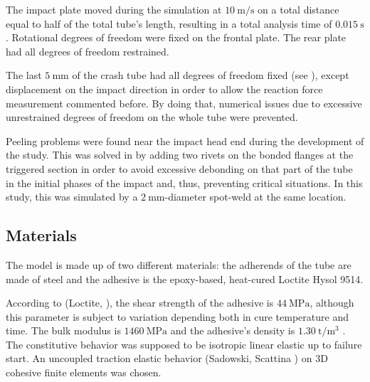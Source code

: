 \documentclass[cmfonts]{witpress}
\begin{document}
The impact plate moved during the simulation at $\SI{10}{\m/\s}$ on a total distance equal to half of the total tube's length, resulting in a total analysis time of $\SI{0.015}{\s}$. Rotational degrees of freedom were fixed on the frontal plate. The rear plate had all degrees of freedom restrained.

The last $\SI{5}{\mm}$ of the crash tube had all degrees of freedom fixed (see ), except displacement on the impact direction in order to allow the reaction force measurement commented before. By doing that, numerical issues due to excessive unrestrained degrees of freedom on the whole tube were prevented.

Peeling problems were found near the impact head end during the development of the study. This was solved in \cite{Peroni2009} by adding two rivets on the bonded flanges at the triggered section in order to avoid excessive debonding on that part of the tube in the initial phases of the impact and, thus, preventing critical situations. In this study, this was simulated by a $\SI{2}{\mm}$-diameter spot-weld at the same location.

\subsection{Materials}

The model is made up of two different materials: the adherends of the tube are made of steel and the adhesive is the epoxy-based, heat-cured Loctite Hysol 9514.

According to (Loctite, \cite{manufCatalog}), the shear strength of the adhesive is $\SI{44}{\MPa}$, although this parameter is subject to variation depending both in cure temperature and time. The bulk modulus is $\SI{1460}{\MPa}$ and the adhesive's density is $\SI{1.30}{\tonne/\m^3}$ \cite{manufCatalog}. The constitutive behavior was supposed to be isotropic linear elastic \cite{SernaMoreno2015} up to failure start. An uncoupled traction elastic behavior (Sadowski, Scattina \cite{Sadowski2010, Sadowski2011, Scattina2011, Sadowski2014}) on 3D cohesive finite elements was chosen.
\end{document}
